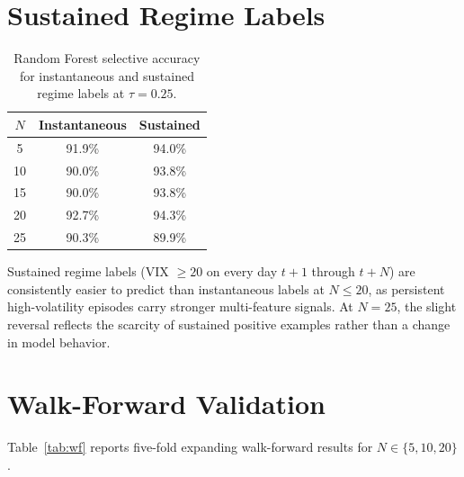 \documentclass[11pt]{article}
\begin{document}
\section{Sustained Regime Labels}
\label{sec:sustained}

\begin{table}[H]
\centering
\caption{Random Forest selective accuracy for instantaneous and sustained regime labels at $\tau = 0.25$.}
\label{tab:sustained}
\begin{tabular}{ccc}
\toprule
$N$ & Instantaneous & Sustained \\
\midrule
5  & 91.9\% & 94.0\% \\
10 & 90.0\% & 93.8\% \\
15 & 90.0\% & 93.8\% \\
20 & 92.7\% & 94.3\% \\
25 & 90.3\% & 89.9\% \\
\bottomrule
\end{tabular}
\end{table}

Sustained regime labels (VIX $\geq 20$ on every day $t+1$ through $t+N$) are consistently easier to predict than instantaneous labels at $N \leq 20$, as persistent high-volatility episodes carry stronger multi-feature signals. At $N = 25$, the slight reversal reflects the scarcity of sustained positive examples rather than a change in model behavior.

\section{Walk-Forward Validation}
\label{sec:wf}

Table~\ref{tab:wf} reports five-fold expanding walk-forward results for $N \in \{5, 10, 20\}$.
\end{document}
